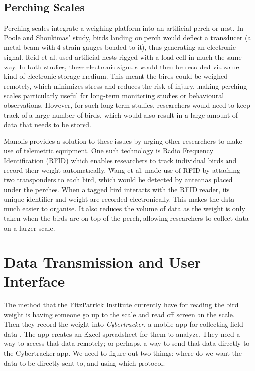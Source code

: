 \documentclass[class=report,11pt,crop=false]{standalone}
\begin{document}
\subsection{Perching Scales}
Perching scales integrate a weighing platform into an artificial perch or nest. In Poole and Shoukimas’ \cite{poole1982scale} study, birds landing on perch would deflect a transducer (a metal beam with 4 strain gauges bonded to it), thus generating an electronic signal. Reid et al. \cite{reid1999measurement} used artificial nests rigged with a load cell in much the same way. In both studies, these electronic signals would then be recorded via some kind of electronic storage medium. This meant the birds could be weighed remotely, which minimizes stress and reduces the risk of injury, making perching scales particularly useful for long-term monitoring studies or behavioural observations. However, for such long-term studies, researchers would need to keep track of a large number of birds, which would also result in a large amount of data that needs to be stored.

Manolis \cite{manoils2024simple} provides a solution to these issues by urging other researchers to make use of telemetric equipment. One such technology is Radio Frequency Identification (RFID) which enables researchers to track individual birds and record their weight automatically. Wang et al. \cite{wang2019rfid} made use of RFID by attaching two transponders to each bird, which would be detected by antennas placed under the perches. When a tagged bird interacts with the RFID reader, its unique identifier and weight are recorded electronically. This makes the data much easier to organise. It also reduces the volume of data as the weight is only taken when the birds are on top of the perch, allowing researchers to collect data on a larger scale. 


\section{Data Transmission and User Interface}
The method that the FitzPatrick Institute currently have for reading the bird weight is having someone go up to the scale and read off screen on the scale. Then they record the weight into \textit{Cybertracker}, a mobile app for collecting field data \cite{cybertracker}. The app creates an Excel spreadsheet for them to analyze. 
They need a way to access that data remotely; or perhaps, a way to send that data directly to the Cybertracker app. We need to figure out two things: where do we want the data to be directly sent to, and using which protocol.
\end{document}

